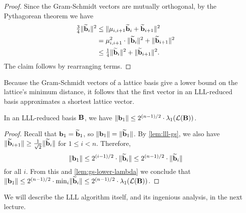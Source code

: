 \documentclass[11pt]{article}
\begin{document}
\begin{proof}
  Since the Gram-Schmidt vectors are mutually orthogonal, by the
  Pythagorean theorem we have
  \begin{align*}
    \tfrac34 \lVert\widetilde{\mathbf{b}}_i\rVert^2
    &\leq \lVert\mu_{i,i+1}\widetilde{\mathbf{b}}_i + \widetilde{\mathbf{b}}_{i+1}\rVert^2 \\
    &= \mu_{i,i+1}^2\cdot \lVert\widetilde{\mathbf{b}}_i\rVert^2 + \lVert\widetilde{\mathbf{b}}_{i+1}\rVert^2 \\
    &\leq \tfrac14 \lVert\widetilde{\mathbf{b}}_i\rVert^2 +
      \lVert\widetilde{\mathbf{b}}_{i+1}\rVert^2.
  \end{align*}
  The claim follows by rearranging terms.
\end{proof}

Because the Gram-Schmidt vectors of a lattice basis give a lower bound
on the lattice's minimum distance, it follows that the first vector in
an LLL-reduced basis approximates a shortest lattice vector.

\begin{corollary}
  \label{cor:lll-lambda}
  In an LLL-reduced basis $\mathbf{B}$, we have
  $\lVert\mathbf{b}_1\rVert \leq 2^{(n-1)/2} \cdot \lambda_{1}(\mathcal{L}(\mathbf{B}))$.
\end{corollary}

\begin{proof}
  Recall that $\mathbf{b}_1 = \widetilde{\mathbf{b}}_1$, so
  $\lVert \mathbf{b}_1\rVert = \lVert\widetilde{\mathbf{b}}_1\rVert$. By \cref{lem:lll-gs},
  we also have
  $\lVert\widetilde{\mathbf{b}}_{i+1}\rVert \geq \frac{1}{\sqrt{2}} \lVert
    \widetilde{\mathbf{b}}_i\rVert$ for $1 \leq i < n$. Therefore,
  \[ \lVert\mathbf{b}_1\rVert \leq 2^{(i-1)/2}\cdot \lVert\widetilde{\mathbf{b}}_i\rVert \leq
    2^{(n-1)/2} \cdot \lVert\widetilde{\mathbf{b}}_{i}\rVert \] for all $i$. From
  this and \cref{lem:gs-lower-lambda} we conclude that
  $\lVert\mathbf{b}_1\rVert \leq 2^{(n-1)/2} \cdot \min_i
  \lVert\widetilde{\mathbf{b}}_i\rVert \leq 2^{(n-1)/2} \cdot
  \lambda_1(\mathcal{L}(\mathbf{B}))$.
\end{proof}

\noindent We will describe the LLL algorithm itself, and its ingenious
analysis, in the next lecture.



\end{document}

